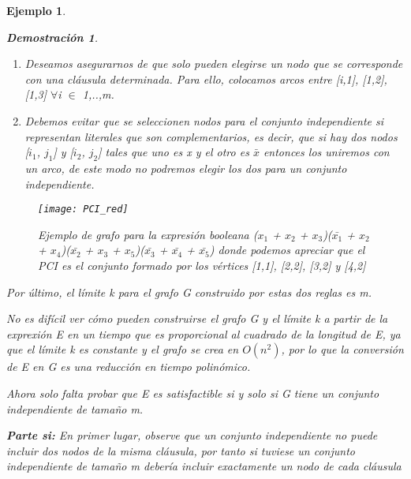 \documentclass[a4paper,12pt,titlepage]{article}
\newtheorem{eje}{Ejemplo}[section]
\newtheorem*{dem}{\textbf{Demostraci\'on}}
\begin{document}
\begin{eje}
\begin{dem}
\begin{enumerate}
\item Deseamos asegurarnos de que solo pueden elegirse un nodo que se corresponde con una cl\'ausula determinada. Para ello, colocamos arcos entre [i,1], [1,2], [1,3] $\forall$i $\in$ {1,..,m}.

\item Debemos evitar que se seleccionen nodos para el conjunto independiente si representan literales que son complementarios, es decir, que si hay dos nodos [$i_1$, $j_1$] y [$i_2$, $j_2$] tales que uno es x y el otro es $\bar{x}$ entonces los uniremos con un arco, de este modo no podremos elegir los dos para un conjunto independiente.

\end{enumerate}

\begin{figure}[h]
\centering
\texttt{[image: PCI\_red]}
\caption{Ejemplo de grafo para la expresi\'on booleana ($x_1$ + $x_2$ + $x_3$)($\bar{x_1}$ + $x_2$ + $x_4$)($\bar{x_2}$ + $x_3$ + $x_5$)($\bar{x_3}$ + $\bar{x_4}$ + $\bar{x_5}$) donde podemos apreciar que el PCI es el conjunto formado por los v\'ertices [1,1], [2,2], [3,2] y [4,2]}
\label{PCI_red}
\end{figure}

Por \'ultimo, el l\'imite k para el grafo G construido por estas dos reglas es m.

\vspace{\baselineskip}

No es dif\'icil ver c\'omo pueden construirse el grafo G y el l\'imite k a partir de la exprexi\'on E en un tiempo que es proporcional al cuadrado de la longitud de E, ya que el l\'imite k es constante y el grafo se crea en $O(n^2)$, por lo que la conversi\'on de E en G es una reducci\'on en tiempo polin\'omico.

\vspace{\baselineskip}

Ahora solo falta probar que E es satisfactible si y solo si G tiene un conjunto independiente de tamaño m.

\vspace{\baselineskip}

\textbf{Parte si:} En primer lugar, observe que un conjunto independiente no puede incluir dos nodos de la misma cl\'ausula, por tanto si tuviese un conjunto independiente de tamaño m deber\'ia incluir exactamente un nodo de cada cl\'ausula


\end{dem}
\end{eje}
\end{document}
